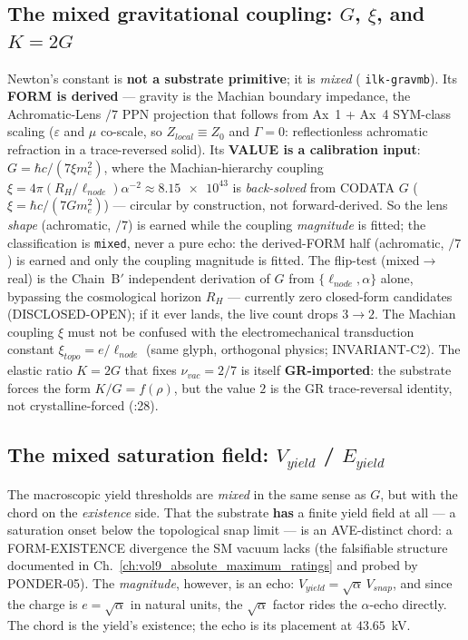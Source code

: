 \subsection{The mixed gravitational coupling: $G$, $\xi$, and $K = 2G$}
\label{subsec:vol9_calib_gravity}

Newton's constant is \textbf{not a substrate primitive}; it is \emph{mixed} ( \texttt{ilk-gravmb}). Its \textbf{FORM is derived} --- gravity is the Machian boundary impedance, the Achromatic-Lens $/7$ PPN projection that follows from Ax~1 + Ax~4 SYM-class scaling ($\varepsilon$ and $\mu$ co-scale, so $Z_{local} \equiv Z_0$ and $\Gamma = 0$: reflectionless achromatic refraction in a trace-reversed solid). Its \textbf{VALUE is a calibration input}: $G = \hbar c/(7\xi m_e^2)$, where the Machian-hierarchy coupling $\xi = 4\pi(R_H/\ell_{node})\alpha^{-2} \approx \num{8.15e43}$ is \emph{back-solved} from CODATA $G$ ($\xi = \hbar c/(7 G m_e^2)$) --- circular by construction, not forward-derived. So the lens \emph{shape} (achromatic, $/7$) is earned while the coupling \emph{magnitude} is fitted; the classification is \texttt{mixed}, never a pure echo: the derived-FORM half (achromatic, $/7$) is earned and only the coupling magnitude is fitted. The flip-test (mixed$\to$real) is the Chain~B$'$ independent derivation of $G$ from $\{\ell_{node}, \alpha\}$ alone, bypassing the cosmological horizon $R_H$ --- currently zero closed-form candidates (DISCLOSED-OPEN); if it ever lands, the live count drops $3 \to 2$. The Machian coupling $\xi$ must not be confused with the electromechanical transduction constant $\xi_{topo} = e/\ell_{node}$ (same glyph, orthogonal physics; INVARIANT-C2). The elastic ratio $K = 2G$ that fixes $\nu_{vac} = 2/7$ is itself \textbf{GR-imported}: the substrate forces the form $K/G = f(\rho)$, but the value $2$ is the GR trace-reversal identity, not crystalline-forced (:28).

\subsection{The mixed saturation field: $V_{yield}$ / $E_{yield}$}
\label{subsec:vol9_calib_yield}

The macroscopic yield thresholds are \emph{mixed} in the same sense as $G$, but with the chord on the \emph{existence} side. That the substrate \textbf{has} a finite yield field at all --- a saturation onset below the topological snap limit --- is an AVE-distinct chord: a FORM-EXISTENCE divergence the SM vacuum lacks (the falsifiable structure documented in Ch.~\ref{ch:vol9_absolute_maximum_ratings} and probed by PONDER-05). The \emph{magnitude}, however, is an echo: $V_{yield} = \sqrt{\alpha}\,V_{snap}$, and since the charge is $e = \sqrt{\alpha}$ in natural units, the $\sqrt{\alpha}$ factor rides the $\alpha$-echo directly. The chord is the yield's existence; the echo is its placement at $43.65$~kV.

